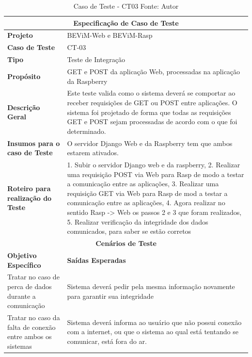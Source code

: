 \begin{table}[H]
    \begin{center}
        \begin{tabular}{|p{5cm}|p{12cm}|}
            \hline
            \multicolumn{2}{|c|}{\textbf{Especificação de Caso de Teste}} \\ \hline
                \textbf{Projeto}                                        & BEViM-Web e BEViM-Rasp \\ \hline
                \textbf{Caso de Teste}                             & CT-03 \\ \hline
                \textbf{Tipo}                                             & Teste de Integração \\ \hline
                \textbf{Propósito}                                     & GET e POST da aplicação Web, processadas na aplicação da Raspberry \\ \hline
                \textbf{Descrição Geral}                           & Este teste valida como o sistema deverá se comportar ao receber requisições de GET ou POST entre aplicações. O sistema foi projetado de forma que todas as requisições GET e POST sejam processadas de acordo com o que foi determinado. \\ \hline
                \textbf{Insumos para o caso de Teste}    & O servidor Django Web e da Raspberry tem que ambos estarem ativados. \\ \hline
                \textbf{Roteiro para realização do Teste}&  1. Subir o servidor Django web e da raspberry, 2. Realizar uma requisição POST via Web para Rasp de modo a testar a comunicação entre as aplicações, 3. Realizar uma requisição GET via Web para Rasp de mod a testar a comunicação entre as aplicações, 4. Agora realizar no sentido Rasp -> Web os passos 2 e 3 que foram realizados, 5. Realizar verificação da integridade dos dados comunicados, para saber se estão corretos \\ \hline
            \multicolumn{2}{|c|}{\textbf{Cenários de Teste}} \\ \hline
                \textbf{Objetivo Específico}                      & \textbf{Saídas Esperadas} \\ \hline
                Tratar no caso de perca de dados durante a comunicação & Sistema deverá pedir pela mesma informação novamente para garantir sua integridade \\ \hline
                Tratar no caso da falta de conexão entre ambos os sistemas & Sistema deverá informa ao usuário que não possui conexão com a internet, ou que o sistema ao qual está tentando se comunicar, está fora do ar. \\ \hline
        \end{tabular}
    \end{center}
    \caption[Caso de Teste - CT03]{Caso de Teste - CT03
    \protect Fonte: Autor}
    \label{CT-03}
\end{table}


